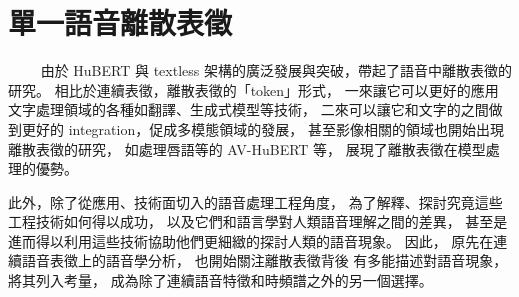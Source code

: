 \chapter{單一語音離散表徵}  %
　　
由於 HuBERT 與 textless 架構的廣泛發展與突破，帶起了語音中離散表徵的研究。
相比於連續表徵，離散表徵的「token」形式，
一來讓它可以更好的應用文字處理領域的各種如翻譯、生成式模型等技術，
二來可以讓它和文字的之間做到更好的 integration，促成多模態領域的發展，
甚至影像相關的領域也開始出現離散表徵的研究，
如處理唇語等的 AV-HuBERT \cite{shi2021learning} 等，
展現了離散表徵在模型處理的優勢。

此外，除了從應用、技術面切入的語音處理工程角度，
為了解釋、探討究竟這些工程技術如何得以成功，
以及它們和語言學對人類語音理解之間的差異，
甚至是進而得以利用這些技術協助他們更細緻的探討人類的語音現象。
因此，
原先在連續語音表徵上的語音學分析，
也開始關注離散表徵背後%
有多能描述對語音現象，
將其列入考量，
成為除了連續語音特徵和時頻譜之外的另一個選擇。

